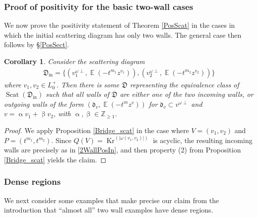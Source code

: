 \documentclass{amsart}
\DeclareMathOperator{\moKr}{Kr}
\newcommand{\Kr}[1]{\moKr^{(#1)}}
\DeclareMathOperator{\In}{in}
\DeclareMathOperator{\EE}{\mathbb{E}}
\DeclareMathOperator{\scat}{Scat}
\let\f=\mathfrak
\renewcommand{\alpha}{\upalpha}
\renewcommand{\beta}{\upbeta}
\theoremstyle{plain}%
\newtheorem{cor}[thm]{Corollary}
\theoremstyle{definition}
\theoremstyle{remark}
\begin{document}
\subsubsection{Proof of positivity for the basic two-wall cases}

We now prove the positivity statement of Theorem \ref{PosScat} in the cases in which the initial scattering diagram has only two walls.  The general case then follows by \S \ref{PosSect}.

\begin{cor}\label{2WallPos}
Consider the scattering diagram
\begin{align}\label{2WallPosIn}
    \f{D}_{\In}=\{(v_1^{\omega\perp},\EE(-t^{m_1}z^{v_1})), (v_2^{\omega\perp},\EE(-t^{m_2}z^{v_2}))\}
\end{align}
where $v_1,v_2\in L_0^{+}$.  Then there is some $\f{D}$ representing the equivalence class of $\scat(\f{D}_{\In})$ such that all walls of $\f{D}$ are either one of the two incoming walls, or outgoing walls of the form $(\f{d}_{v},\EE(-t^mz^v))$ for $
\f{d}_v\subset v^{\omega \perp}
$ and $v=\alpha  v_1+\beta v_2$, with $\alpha,\beta\in\mathbb{Z}_{\geq 1}$.
\end{cor}


\begin{proof}
We apply Proposition \ref{Bridge_scat} in the case where $V=(v_1,v_2)$ and $P=(t^{m_1},t^{m_2})$.  Since $Q(V)=\Kr{|\omega(v_1,v_2)|}$ is acyclic, the resulting incoming walls are precisely as in \eqref{2WallPosIn}, and then property (2) from Proposition \ref{Bridge_scat} yields the claim. 
\end{proof}

\subsubsection{Dense regions}\label{denseSec}
We next consider some examples that make precise our claim from the introduction that ``almost all'' two wall examples have dense regions.
\end{document}
